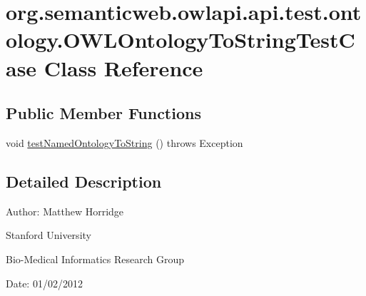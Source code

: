 \hypertarget{classorg_1_1semanticweb_1_1owlapi_1_1api_1_1test_1_1ontology_1_1_o_w_l_ontology_to_string_test_case}{\section{org.\-semanticweb.\-owlapi.\-api.\-test.\-ontology.\-O\-W\-L\-Ontology\-To\-String\-Test\-Case Class Reference}
\label{classorg_1_1semanticweb_1_1owlapi_1_1api_1_1test_1_1ontology_1_1_o_w_l_ontology_to_string_test_case}
}
\subsection*{Public Member Functions}
\begin{DoxyCompactItemize}
\item 
void \hyperlink{classorg_1_1semanticweb_1_1owlapi_1_1api_1_1test_1_1ontology_1_1_o_w_l_ontology_to_string_test_case_a56665c97826fd5004daf535337cda38e}{test\-Named\-Ontology\-To\-String} ()  throws Exception 
\end{DoxyCompactItemize}


\subsection{Detailed Description}
Author\-: Matthew Horridge\par
 Stanford University\par
 Bio-\/\-Medical Informatics Research Group\par
 Date\-: 01/02/2012 

